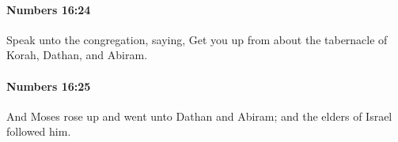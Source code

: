 		\paragraph{Numbers 16:24} %
			\label{NUMBERS-16-24}

			Speak unto the congregation, saying, Get you up from about the tabernacle of Korah, Dathan, and Abiram.


		\paragraph{Numbers 16:25} %
			\label{NUMBERS-16-25}

			And Moses rose up and went unto Dathan and Abiram; and the elders of Israel followed him.


